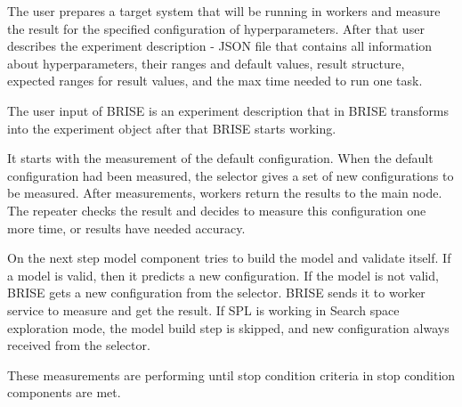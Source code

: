The user prepares a target system that will be running in workers and measure the result for the specified configuration of hyperparameters.
After that user describes the experiment description - JSON file that contains all information about hyperparameters, their ranges and default values, result structure, expected ranges for result values, and the max time needed to run one task.

The user input of BRISE is an experiment description that in BRISE transforms into the experiment object after that BRISE starts working.

It starts with the measurement of the default configuration. When the default configuration had been measured, the selector gives a set of new configurations to be measured. After measurements, workers return the results to the main node. The repeater checks the result and decides to measure this configuration one more time, or results have needed accuracy. 

On the next step model component tries to build the model and validate itself. If a model is valid, then it predicts a new configuration. If the model is not valid, BRISE gets a new configuration from the selector. BRISE sends it to worker service to measure and get the result. If SPL is working in Search space exploration mode, the model build step is skipped, and new configuration always received from the selector. 

These measurements are performing until stop condition criteria in stop condition components are met.
